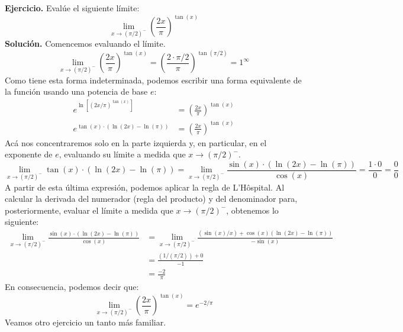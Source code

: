 \documentclass[12pt]{article}
\begin{document}
\textbf{Ejercicio.} \quad Evalúe el siguiente límite:
\[
	\lim_{x \to (\pi/2)^{-}} \left(\frac{2x}{\pi}\right)^{\tan(x)}
\]
\textbf{Solución.} \quad Comencemos evaluando el límite.
\[
	\lim_{x \to (\pi/2)^{-}} \left(\frac{2x}{\pi}\right)^{\tan(x)} =
	\left(\frac{2 \cdot \pi/2}{\pi}\right)^{\tan(\pi/2)} =
	1^{\infty}
\]
Como tiene esta forma indeterminada, podemos escribir una forma equivalente de la función usando una potencia de base $e$:
\begin{align*}
	e^{\ln[(2x/\pi)^{\tan(x)}]} &=
	\left(
		\frac{2x}{\pi}	
	\right)^{\tan(x)} \\
	e^{\tan(x) \cdot (\ln(2x) - \ln(\pi))} &=
	\left(
		\frac{2x}{\pi}	
	\right)^{\tan(x)}
\end{align*}
Acá nos concentraremos solo en la parte izquierda y, en particular, en el exponente de $e$, evaluando su límite a medida que $x \to (\pi/2)^{-}$.
\[
\lim_{x \to (\pi/2)^{-}}
	\tan(x) \cdot (\ln(2x) - \ln(\pi)) = 
\lim_{x \to (\pi/2)^{-}}
	\frac{\sin(x) \cdot (\ln(2x) - \ln(\pi))}{\cos(x)} =
\frac{1 \cdot 0}{0} = \frac{0}{0}
\]
A partir de esta última expresión, podemos aplicar la regla de L'Hôspital. Al calcular la derivada del numerador (regla del producto) y del denominador para, posteriormente, evaluar el límite a medida que $x \to (\pi/2)^{-}$, obtenemos lo siguiente:
\begin{align*}
\lim_{x \to (\pi/2)^{-}}
	\frac{\sin(x) \cdot (\ln(2x) - \ln(\pi))}{\cos(x)} &= 
\lim_{x \to (\pi/2)^{-}}
	\frac{(\sin(x)/x) + \cos(x)(\ln(2x) - \ln(\pi))}{-\sin(x)} \\
&= \frac{(1/(\pi/2)) + 0}{-1} \\
&= \frac{-2}{\pi}
\end{align*}
En consecuencia, podemos decir que:
\[
	\lim_{x \to (\pi/2)^{-}} \left(\frac{2x}{\pi}\right)^{\tan(x)} =
	e^{-2/\pi}
\]
Veamos otro ejercicio un tanto más familiar.

\newpage
\end{document}
